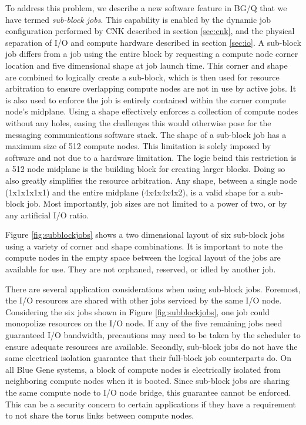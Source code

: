 To address this problem, we describe a new software feature in BG/Q that we have termed \emph{sub-block jobs}.
This capability is enabled by the dynamic job configuration performed by CNK described in section \ref{sec:cnk},
and the physical separation of I/O and compute hardware described in section \ref{sec:io}. A sub-block job differs
from a job using the entire block by requesting a compute node corner location and five
dimensional shape at job launch time. This corner and shape are combined to logically create a sub-block, which
is then used for resource arbitration to ensure overlapping compute nodes are not in use by active jobs. It is 
also used to enforce the job is entirely contained within the corner compute node's midplane. Using a shape 
effectively enforces a collection of compute nodes without any holes, easing the challenges this would otherwise pose for the messaging 
communications software stack. The shape of a sub-block job has a maximum size of 512 compute nodes. This limitation is 
solely imposed by software and not due to a hardware limitation. The logic beind this restriction is a 512 node midplane is the 
building block for creating larger blocks. Doing so also greatly simplifies the resource arbitration. Any shape,
between a single node (1x1x1x1x1) and the entire midplane (4x4x4x4x2), is a valid shape for a sub-block job. Most
importantly, job sizes are not limited to a power of two, or by any artificial I/O ratio. 

Figure \ref{fig:subblockjobs} shows a two dimensional layout of six sub-block jobs using a variety of corner
and shape combinations. It is important to note the compute nodes in the empty space between the logical layout of the
jobs are available for use. They are not orphaned, reserved, or idled by another job.

There are several application considerations when using sub-block jobs. Foremost, the I/O resources are shared with other jobs 
serviced by the same I/O node. Considering the six jobs shown in Figure \ref{fig:subblockjobs}, one job could 
monopolize resources on the I/O node. If any of the five remaining jobs need guaranteed I/O bandwidth, 
precautions may need to be taken by the scheduler to ensure adequate resources are available. Secondly, sub-block jobs 
do not have the same electrical isolation guarantee that their full-block job counterparts do. On all Blue Gene systems, 
a block of compute nodes is electrically isolated from neighboring compute nodes when it is booted. Since sub-block jobs are 
sharing the same compute node to I/O node bridge, this guarantee cannot be enforced. This can be a security
concern to certain applications if they have a requirement to not share the torus links between compute nodes.

